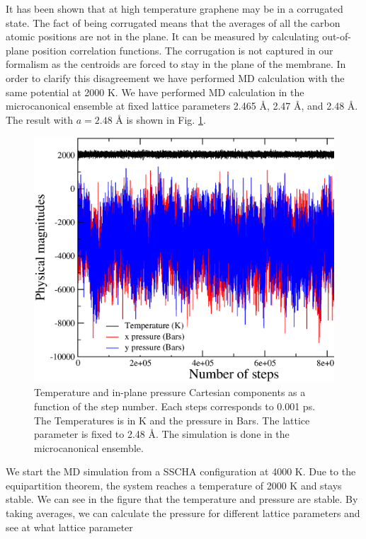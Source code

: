 It has been shown that at high temperature graphene may be in a corrugated 
state\cite{pozzo2011thermal,los2009scaling}. The fact of being corrugated means that the averages of all the carbon 
atomic positions are not in the plane. It can be measured by calculating out-of-plane position correlation functions. 
The corrugation is not captured in our formalism as the centroids are 
forced to stay in the plane of the membrane. In order to clarify this disagreement we have performed MD calculation 
with the same potential at 2000 K. We have performed MD calculation in the microcanonical ensemble at fixed lattice 
parameters 2.465 \AA, 2.47 \AA, and 2.48 \AA. The result with $a=2.48$ \AA \hspace{0.1cm} is shown in Fig. \ref{md1}.
\begin{figure}[ht]
\includegraphics[width=0.99\linewidth]{Figures/md1.eps}
\caption[Molecular dynamics run.]{Temperature and in-plane pressure Cartesian components as a function of
the step number. Each steps corresponds to 0.001 ps. The Temperatures is in K and the pressure in Bars. The lattice 
parameter is fixed to 2.48 \AA. The simulation is done in the microcanonical ensemble.}
\label{md1}
\end{figure}
We start the MD simulation from a SSCHA configuration at 4000 K. Due to the equipartition theorem, the system reaches
a temperature of 2000 K and stays stable. We can see in the figure that the temperature and pressure are stable. By 
taking averages, we can calculate the pressure for different lattice parameters and see at what lattice parameter 
